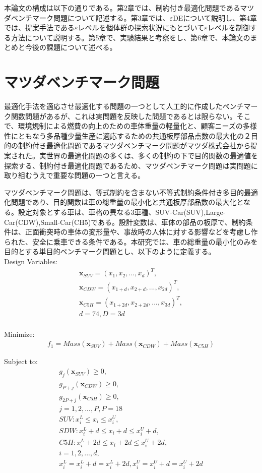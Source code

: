 \documentclass[a4paper,12pt]{jsreport}
\begin{document}
本論文の構成は以下の通りである。第2章では、制約付き最適化問題であるマツダベンチマーク問題について記述する。第3章では、$\varepsilon$DEについて説明し、第4章では、提案手法である$\varepsilon$レベルを個体群の探索状況にもとづいて$\varepsilon$レベルを制御する方法について説明する。第5章で、実験結果と考察をし、第6章で、本論文のまとめと今後の課題について述べる。


\chapter{マツダベンチマーク問題}
最適化手法を適応させ最適化する問題の一つとして人工的に作成したベンチマーク関数問題があるが、これは実問題を反映した問題であるとは限らない。そこで、環境規制による燃費の向上のための車体重量の軽量化と、顧客ニーズの多様性にともなう多品種少量生産に適応するための共通板厚部品点数の最大化の２目的の制約付き最適化問題であるマツダベンチマーク問題がマツダ株式会社から提案された\cite{マツダベンチマーク問題}。実世界の最適化問題の多くは、多くの制約の下で目的関数の最適値を探索する、制約付き最適化問題であるため、マツダベンチマーク問題は実問題に取り組むうえで重要な問題の一つと言える。

マツダベンチマーク問題は、等式制約を含まない不等式制約条件付き多目的最適化問題であり、目的関数は車の総重量の最小化と共通板厚部品数の最大化となる。設定対象とする車は、車格の異なる3車種、SUV-Car(SUV),Large-Car(CDW),Small-Car(CH5)である。設計変数は、車体の部品の板厚で、制約条件は、正面衝突時の車体の変形量や、事故時の人体に対する影響などを考慮し作られた、安全に乗車できる条件である。本研究では、車の総重量の最小化のみを目的とする単目的ベンチマーク問題とし、以下のように定義する\cite{マツダベンチマーク問題}。
\\
{\large{Design Variables:}}
\begin{eqnarray}
\bm{x}_{SUV}={({x}_1,{x}_2,...,{x}_d)}^T,\\
\bm{x}_{CDW}={({x}_{1+d},{x}_{2+d},...,{x}_{2d})}^T,\\
\bm{x}_{C5H}={({x}_{1+2d},{x}_{2+2d},...,{x}_{3d})}^T,\\
d=74,D=3d\nonumber
\end{eqnarray}
\\
{\large{Minimize:}}
\begin{eqnarray}
{f}_1=Mass(\bm{x}_{SUV})+Mass(\bm{x}_{CDW})+Mass(\bm{x}_{C5H})
\end{eqnarray}

{\large{Subject to:}}
\begin{eqnarray}
{g}_j(\bm{x}_{SUV})\geq0,\\
{g}_{P+j}(\bm{x}_{CDW})\geq0,\\
{g}_{2P+j}(\bm{x}_{C5H})\geq0,\\
j=1,2,...,P,P=18\nonumber\\
SUV:{x}^L_i\leq {x}_i\leq {x}^U_i,\\
SDW:{x}^L_i+d\leq {x}_i+d\leq {x}^U_i+d,\\
C5H:{x}^L_i+2d\leq {x}_i+2d\leq {x}^U_i+2d,\\
i=1,2,...,d,\nonumber\\
{x}^L_i={x}^L_i+d={x}^L_i+2d,{x}^U_i={x}^U_i+d={x}^U_i+2d
\end{eqnarray}
\end{document}
